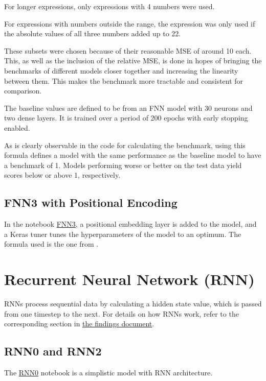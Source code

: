 \documentclass{article}
\begin{document}
For longer expressions, only expressions with 4 numbers were used.

For expressions with numbers outside the range, the expression was only used if the absolute values of all three numbers added up to 22.

These subsets were chosen because of their reasonable MSE of around 10 each.
\\[1em]
This, as well as the inclusion of the relative MSE, is done in hopes of bringing the benchmarks of different models closer together and increasing the linearity between them. This makes the benchmark more tractable and consistent for comparison.

The baseline values are defined to be from an FNN model with 30 neurons and two dense layers. It is trained over a period of 200 epochs with early stopping enabled.

As is clearly observable in the code for calculating the benchmark, using this formula defines a model with the same performance as the baseline model to have a benchmark of 1. Models performing worse or better on the test data yield scores below or above 1, respectively.

\subsection{FNN3 with Positional Encoding}

In the notebook \href{https://github.com/AntonStantan/matura/blob/main/FNN/FNN3.ipynb}{FNN3}, a positional embedding layer is added to the model, and a Keras tuner tunes the hyperparameters of the model to an optimum. The formula used is the one from \cite{vaswani2023attentionneed}.


\section{Recurrent Neural Network (RNN)}

RNNs process sequential data by calculating a hidden state value, which is passed from one timestep to the next. For details on how RNNs work, refer to the corresponding section in \href{https://github.com/AntonStantan/matura/blob/main/documentation/findings/findings.pdf}{the findings document}.

\subsection{RNN0 and RNN2}
The \href{https://github.com/AntonStantan/matura/blob/main/RNN/RNN0.ipynb}{RNN0} notebook is a simplistic model with RNN architecture.
\end{document}

